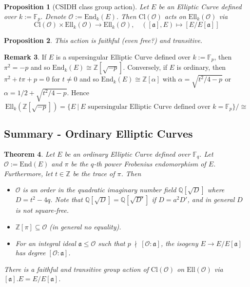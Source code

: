 \documentclass{scrartcl}
\newcommand{\Z}{\mathbb{Z}}
\newcommand{\F}{\mathbb{F}}
\newcommand{\End}{\mathrm{End}}
\newcommand{\Ell}{\mathrm{Ell}}
\newcommand{\Cl}{\mathrm{Cl}}
\newcommand{\Order}{\mathcal{O}}
\newcommand{\notdivides}{\ \nmid \ }
\newtheorem{prop}{Proposition}[section]
\newtheorem{theorem}[prop]{Theorem}
\theoremstyle{definition}
\newtheorem{remark}[prop]{Remark}
\begin{document}
\begin{prop}[CSIDH class group action]
    Let $E$ be an Elliptic Curve defined over $k := \F_p$.
    Denote $\Order := \End_k(E)$.
    Then $\Cl(\Order)$ acts on $\Ell_k(\Order)$ via
    \begin{equation*}
        \Cl(\Order) \times \Ell_k(\Order) \to \Ell_k(\Order), \quad ([\mathfrak{a}], E) \mapsto [E/E[\mathfrak{a}]]
    \end{equation*}
\end{prop}
\begin{prop}
    This action is faithful (even free?) and transitive.
\end{prop}
\begin{remark}
    If $E$ is a supersingular Elliptic Curve defined over $k := \F_p$, then $\pi^2 = -p$ and so $\End_k(E) \cong \Z[\sqrt{-p}]$.
    Conversely, if $E$ is ordinary, then $\pi^2 + t \pi + p = 0$ for $t \neq 0$ and so $\End_k(E) \cong \Z[\alpha]$ with $\alpha = \sqrt{t^2/4 - p}$ or $\alpha = 1/2 + \sqrt{t^2/4 - p}$.
    Hence
    \begin{equation*}
        \Ell_k(\Z[\sqrt{-p}]) = \{ E \ | \ \text{$E$ supersingular Elliptic Curve defined over $k = \F_p$} \} / \cong
    \end{equation*}
\end{remark}

\subsection{Summary - Ordinary Elliptic Curves}
\begin{theorem}
    Let $E$ be an ordinary Elliptic Curve defined over $\F_q$.
    Let $\Order := \End(E)$ and $\pi$ be the $q$-th power Frobenius endomorphism of $E$.
    Furthermore, let $t \in \Z$ be the trace of $\pi$.
    Then
    \begin{itemize}
        \item $\Order$ is an order in the quadratic imaginary number field $\mathbb{Q}[\sqrt{D}]$ where $D = t^2 - 4q$.
        Note that $\mathbb{Q}[\sqrt{D}] = \mathbb{Q}[\sqrt{D'}]$ if $D = a^2D'$, and in general $D$ is not square-free.
        \item $\Z[\pi] \subseteq \Order$ (in general no equality).
        \item For an integral ideal $\mathfrak{a} \leq \Order$ such that $p \notdivides [\Order : \mathfrak{a}]$, the isogeny $E \to E/E[\mathfrak{a}]$ has degree $[\Order : \mathfrak{a}]$.
    \end{itemize}
    There is a faithful and transitive group action of $\Cl(\Order)$ on $\Ell(\Order)$ via $[\mathfrak{a}].E = E/E[\mathfrak{a}]$.
\end{theorem}
\end{document}
